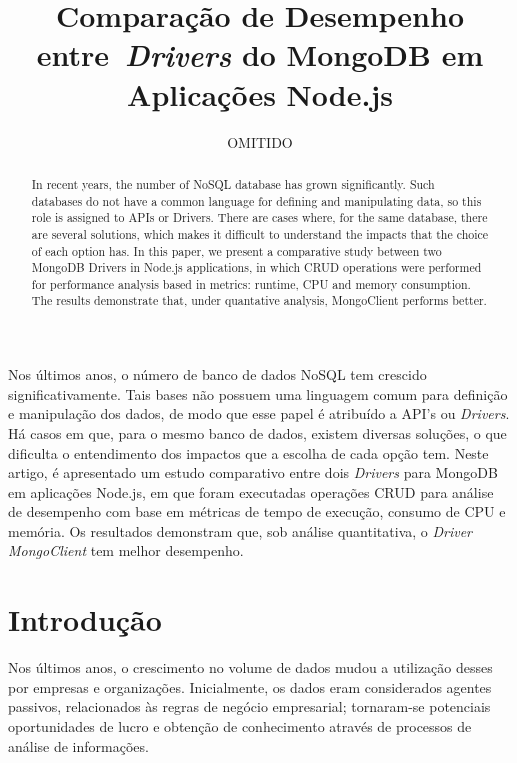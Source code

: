 \documentclass[12pt]{article}
\title{Comparação de Desempenho entre~\emph{Drivers} do MongoDB em Aplicações Node.js}
\author{OMITIDO}
\begin{document}
 

\maketitle

\begin{abstract}
In recent years, the number of NoSQL database has grown significantly. Such databases do not have a common language for defining and manipulating data, so this role is assigned to APIs or Drivers. There are cases where, for the same database, there are several solutions, which makes it difficult to understand the impacts that the choice of each option has. In this paper, we present a comparative study between two MongoDB Drivers in Node.js applications, in which CRUD operations were performed for performance analysis based in metrics: runtime, CPU and memory consumption. The results demonstrate that, under quantative analysis, MongoClient performs better.
\end{abstract}
     
\begin{resumo} 
Nos últimos anos, o número de banco de dados NoSQL tem crescido significativamente. Tais bases não possuem uma linguagem comum para definição e manipulação dos dados, de modo que esse papel é atribuído a API's ou \emph{Drivers}. Há casos em que, para o mesmo banco de dados, existem diversas soluções, o que dificulta o entendimento dos impactos que a escolha de cada opção tem. Neste artigo, é apresentado um estudo comparativo entre dois \emph{Drivers} para MongoDB em aplicações Node.js, em que foram executadas operações CRUD para análise de desempenho com base em métricas de tempo de execução, consumo de CPU e memória. Os resultados demonstram que, sob análise quantitativa, o \emph{Driver} \emph{MongoClient} tem melhor desempenho.
\end{resumo}


\section{Introdução}

Nos últimos anos, o crescimento no volume de dados mudou a utilização desses por empresas e organizações. Inicialmente, os dados eram considerados agentes passivos, relacionados às regras de negócio empresarial; tornaram-se potenciais oportunidades de lucro e obtenção de conhecimento através de processos de análise de informações.
\end{document}
